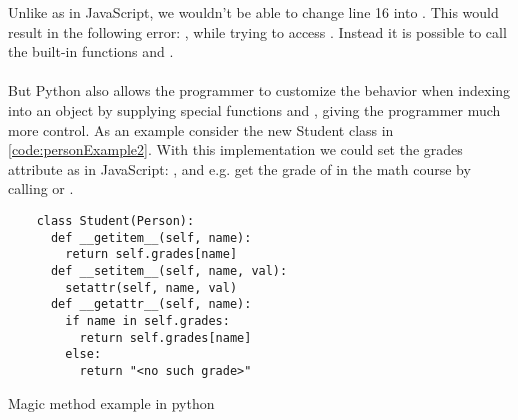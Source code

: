 Unlike as in JavaScript, we wouldn't be able to change line 16 into . This would result in the following error: , while trying to access . Instead it is possible to call the built-in functions  and . \\
\\
But Python also allows the programmer to customize the behavior when indexing into an object by supplying special functions  and , giving the programmer much more control. As an example consider the new Student class in \ref{code:personExample2}. With this implementation we could set the grades attribute as in JavaScript: , and e.g. get the grade of  in the math course by calling  or .

\begin{listing}[H]
	\begin{verbatim}
	class Student(Person):
	  def __getitem__(self, name):
	    return self.grades[name]
	  def __setitem__(self, name, val):
	    setattr(self, name, val)
	  def __getattr__(self, name):
	    if name in self.grades:
	      return self.grades[name]
	    else:
	      return "<no such grade>"
	\end{verbatim}
	\caption{Magic method example in python}
	\label{code:personExample2}
\end{listing}